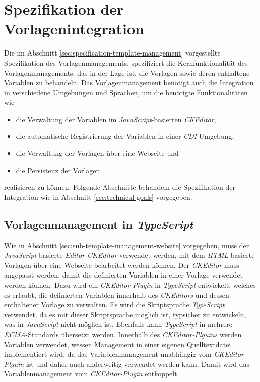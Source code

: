 \section{Spezifikation der Vorlagenintegration}
Die im Abschnitt \ref{sec:specification-template-management} vorgestellte Spezifikation des Vorlagenmanagements, spezifiziert die Kernfunktionalität des Vorlagenmanagements, das in der Lage ist, die Vorlagen sowie deren enthaltene Variablen zu behandeln. Das Vorlagenmanagement benötigt auch die Integration in verschiedene Umgebungen und Sprachen, um die benötigte Funktionalitäten wie
\begin{itemize}
	\item die Verwaltung der Variablen im  \emph{JavaScript}-basierten \emph{CKEditor},
	\item die automatische Registrierung der Variablen in einer \emph{CDI}-Umgebung,
	\item die Verwaltung der Vorlagen über eine Webseite und
	\item die Persistenz der Vorlagen
\end{itemize}
realisieren zu können.
\newline
Folgende Abschnitte behandeln die Spezifikation der Integration wie in Abschnitt \ref{sec:technical-goals} vorgegeben. 
 
\subsection{Vorlagenmanagement in \emph{TypeScript}}
\label{sec:sub-typescript-javascript}
Wie in Abschnitt \ref{sec:sub-template-management-website} vorgegeben, muss der \emph{JavaScript}-basierte \emph{Editor CKEditor} verwendet werden, mit dem \emph{HTML} basierte Vorlagen über eine Webseite bearbeitet werden können. Der \emph{CKEditor} muss angepasst werden, damit die definierten Variablen in einer Vorlage verwendet werden können. 
\newline
\newline
Dazu wird ein \emph{CKEditor-Plugin} in \emph{TypeScript} entwickelt, welches es erlaubt, die definierten Variablen innerhalb des \emph{CKEditors} und dessen enthaltener Vorlage zu verwalten. Es wird die Skriptsprache \emph{TypeScript} verwendet, da es mit dieser Skriptsprache möglich ist, typsicher zu entwickeln, was in \emph{JavaScript} nicht möglich ist. Ebenfalls kann \emph{TypeScript} in mehrere \emph{ECMA}-Standards übersetzt werden.
\newline
\newline
Innerhalb des \emph{CKEditor-Plguins} werden Variablen verwendet, wessen Management in einer eigenen Quelltextdatei implementiert wird, da das Variablenmanagement unabhängig vom \emph{CKEditor-Plguin} ist und daher auch anderweitig verwendet werden kann. Damit wird das Variablenmanagement vom \emph{CKEditor-Plugin} entkoppelt.

